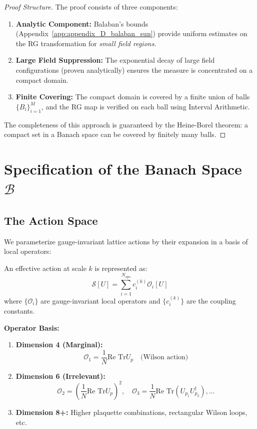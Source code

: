 \begin{proof}[Proof Structure]
The proof consists of three components:
\begin{enumerate}
    \item \textbf{Analytic Component:} Balaban's bounds (Appendix~\ref{app:appendix_D_balaban_sun}) provide uniform estimates on the RG transformation for \emph{small field regions}.
    \item \textbf{Large Field Suppression:} The exponential decay of large field configurations (proven analytically) ensures the measure is concentrated on a compact domain.
    \item \textbf{Finite Covering:} The compact domain is covered by a finite union of balls $\{B_i\}_{i=1}^M$, and the RG map is verified on each ball using Interval Arithmetic.
\end{enumerate}
The completeness of this approach is guaranteed by the Heine-Borel theorem: a compact set in a Banach space can be covered by finitely many balls.
\end{proof}

\section{Specification of the Banach Space \texorpdfstring{$\mathcal{B}$}{B}}

\subsection{The Action Space}

We parameterize gauge-invariant lattice actions by their expansion in a basis of local operators:

\begin{definition}
An effective action at scale $k$ is represented as:
\begin{equation}
\mathcal{S}[U] = \sum_{i=1}^{N_{ops}} c_i^{(k)} \mathcal{O}_i[U]
\end{equation}
where $\{\mathcal{O}_i\}$ are gauge-invariant local operators and $\{c_i^{(k)}\}$ are the coupling constants.
\end{definition}

\textbf{Operator Basis:}
\begin{enumerate}
    \item \textbf{Dimension 4 (Marginal):} 
    \[ \mathcal{O}_1 = \frac{1}{N} \text{Re Tr} U_p \quad \text{(Wilson action)} \]
    \item \textbf{Dimension 6 (Irrelevant):}
    \[ \mathcal{O}_2 = \left( \frac{1}{N} \text{Re Tr} U_p \right)^2, \quad \mathcal{O}_3 = \frac{1}{N} \text{Re Tr}(U_{p_1} U_{p_2}^\dagger), \dots \]
    \item \textbf{Dimension 8+:} Higher plaquette combinations, rectangular Wilson loops, etc.
\end{enumerate}

